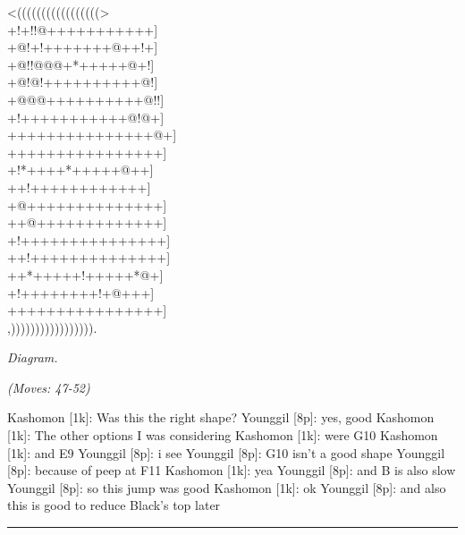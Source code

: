 \documentclass[letterpaper,12pt]{memoir}
\newcounter{GoFigure}[part]
\newcommand{\gofigure}{%
 \stepcounter{GoFigure}
 \centerline{\textit{Diagram.\thinspace\arabic{GoFigure}}}
}
\newcommand{\subtext}[1]{\centerline{\textit{#1}}}
\begin{document}
\begin{minipage}[t]{0.5\textwidth}
{\gnos
<(((((((((((((((((>\\
+!+!!@+++++++++++]\\
+@!+!+++++++@++!+]\\
+@!!@@@+*+++++@+!]\\
+@!@!++++++++++@!]\\
+@@@++++++++++@!!]\\
+!+++++++++++@!@+]\\
+++++++++++++++@+]\\
++++++++++++++++]\\
+!*++++*+++++@++]\\
++!++++++++++++]\\
+@++++++++++++++]\\
++@+++++++++++++]\\
+!+++++++++++++++]\\
++!++++++++++++++]\\
++*+++++!+++++*@+]\\
+!++++++++!+@+++]\\
++++++++++++++++]\\
,))))))))))))))))).\\
}
\gofigure

\subtext{(Moves: 47-52)}
\end{minipage}
\begin{minipage}[t]{0.5\textwidth}
\setlength{\parskip}{0.5em}
Kashomon [1k]: Was this the right shape?
Younggil [8p]: yes, good
Kashomon [1k]: The other options I was considering
Kashomon [1k]: were G10
Kashomon [1k]: and E9
Younggil [8p]: i see
Younggil [8p]: G10 isn't a good shape
Younggil [8p]: because of peep at F11
Kashomon [1k]: yea
Younggil [8p]: and B is also slow
Younggil [8p]: so this jump was good
Kashomon [1k]: ok
Younggil [8p]: and also this is good to reduce Black's top later


\end{minipage}
\vfill

\rule{\textwidth}{0.5pt}
\end{document}
